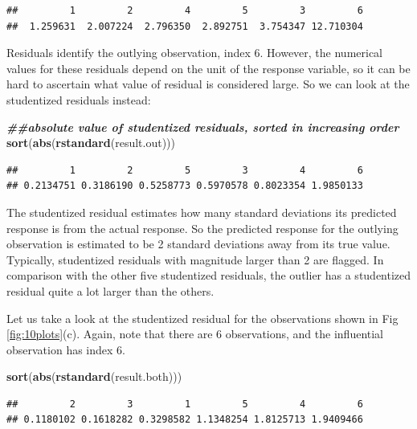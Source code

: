 \documentclass[
]{book}
\newenvironment{Shaded}{\begin{snugshade}}{\end{snugshade}}
\newcommand{\DocumentationTok}[1]{\textcolor[rgb]{0.56,0.35,0.01}{\textbf{\textit{#1}}}}
\newcommand{\FunctionTok}[1]{\textcolor[rgb]{0.13,0.29,0.53}{\textbf{#1}}}
\newcommand{\NormalTok}[1]{#1}
\begin{document}
\begin{verbatim}
##         1         2         4         5         3         6 
##  1.259631  2.007224  2.796350  2.892751  3.754347 12.710304
\end{verbatim}

Residuals identify the outlying observation, index 6. However, the numerical values for these residuals depend on the unit of the response variable, so it can be hard to ascertain what value of residual is considered large. So we can look at the studentized residuals instead:

\begin{Shaded}
\begin{Highlighting}[]
\DocumentationTok{\#\#absolute value of studentized residuals, sorted in increasing order}
\FunctionTok{sort}\NormalTok{(}\FunctionTok{abs}\NormalTok{(}\FunctionTok{rstandard}\NormalTok{(result.out)))}
\end{Highlighting}
\end{Shaded}

\begin{verbatim}
##         1         2         5         3         4         6 
## 0.2134751 0.3186190 0.5258773 0.5970578 0.8023354 1.9850133
\end{verbatim}

The studentized residual estimates how many standard deviations its predicted response is from the actual response. So the predicted response for the outlying observation is estimated to be 2 standard deviations away from its true value. Typically, studentized residuals with magnitude larger than 2 are flagged. In comparison with the other five studentized residuals, the outlier has a studentized residual quite a lot larger than the others.

Let us take a look at the studentized residual for the observations shown in Fig \ref{fig:10plots}(c). Again, note that there are 6 observations, and the influential observation has index 6.

\begin{Shaded}
\begin{Highlighting}[]
\FunctionTok{sort}\NormalTok{(}\FunctionTok{abs}\NormalTok{(}\FunctionTok{rstandard}\NormalTok{(result.both)))}
\end{Highlighting}
\end{Shaded}

\begin{verbatim}
##         2         3         1         5         4         6 
## 0.1180102 0.1618282 0.3298582 1.1348254 1.8125713 1.9409466
\end{verbatim}
\end{document}
